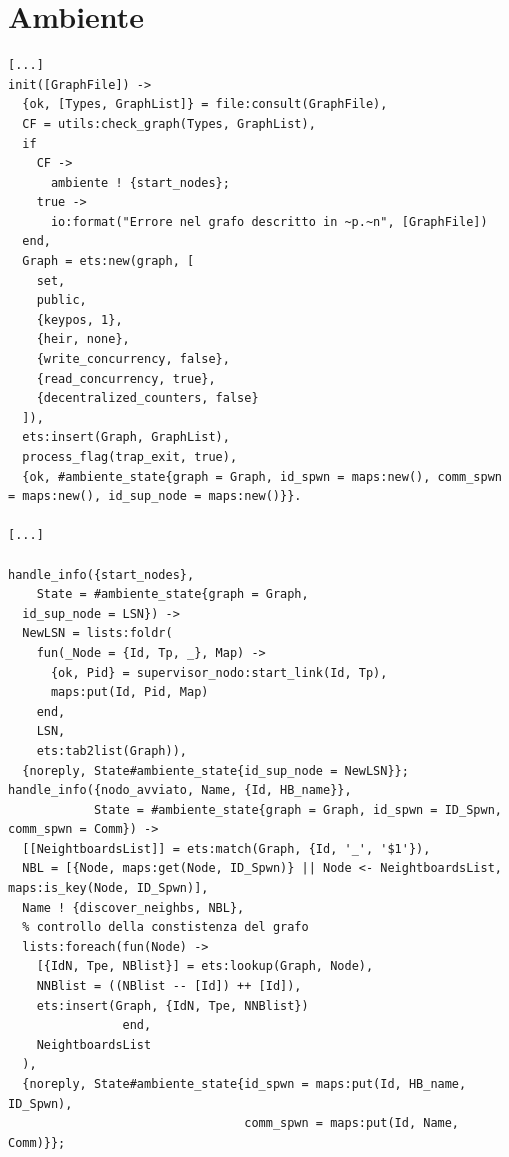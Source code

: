 \documentclass[italian]{memoir}
\begin{document}
\chapter{Ambiente}\label{code:ambiente}
\begin{verbatim}
[...]
init([GraphFile]) ->
  {ok, [Types, GraphList]} = file:consult(GraphFile),
  CF = utils:check_graph(Types, GraphList),
  if
    CF ->
      ambiente ! {start_nodes};
    true ->
      io:format("Errore nel grafo descritto in ~p.~n", [GraphFile])
  end,
  Graph = ets:new(graph, [
    set,
    public,
    {keypos, 1},
    {heir, none},
    {write_concurrency, false},
    {read_concurrency, true},
    {decentralized_counters, false}
  ]),
  ets:insert(Graph, GraphList),
  process_flag(trap_exit, true),
  {ok, #ambiente_state{graph = Graph, id_spwn = maps:new(), comm_spwn = maps:new(), id_sup_node = maps:new()}}.

[...]

handle_info({start_nodes}, 
    State = #ambiente_state{graph = Graph, 
  id_sup_node = LSN}) ->
  NewLSN = lists:foldr(
    fun(_Node = {Id, Tp, _}, Map) ->
      {ok, Pid} = supervisor_nodo:start_link(Id, Tp),
      maps:put(Id, Pid, Map)
    end,
    LSN,
    ets:tab2list(Graph)),
  {noreply, State#ambiente_state{id_sup_node = NewLSN}};
handle_info({nodo_avviato, Name, {Id, HB_name}}, 
            State = #ambiente_state{graph = Graph, id_spwn = ID_Spwn, comm_spwn = Comm}) ->
  [[NeightboardsList]] = ets:match(Graph, {Id, '_', '$1'}),
  NBL = [{Node, maps:get(Node, ID_Spwn)} || Node <- NeightboardsList, maps:is_key(Node, ID_Spwn)],
  Name ! {discover_neighbs, NBL},
  % controllo della constistenza del grafo
  lists:foreach(fun(Node) ->
    [{IdN, Tpe, NBlist}] = ets:lookup(Graph, Node),
    NNBlist = ((NBlist -- [Id]) ++ [Id]),
    ets:insert(Graph, {IdN, Tpe, NNBlist})
                end,
    NeightboardsList
  ),
  {noreply, State#ambiente_state{id_spwn = maps:put(Id, HB_name, ID_Spwn), 
                                 comm_spwn = maps:put(Id, Name, Comm)}};
\end{verbatim}
\end{document}
